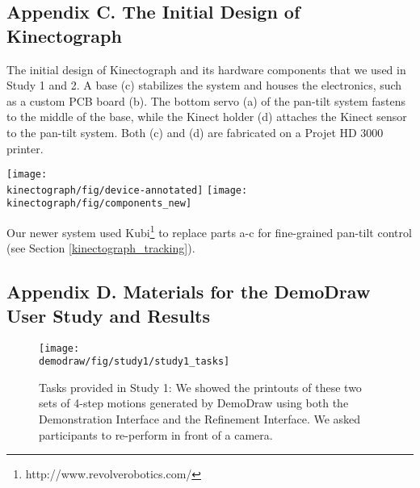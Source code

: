 \begin{appendices}
\clearpage


\subsection{Appendix C. The Initial Design of Kinectograph}
\label{kinectograph_original_design}

The initial design of Kinectograph and its hardware components that we used in Study 1 and 2. A base (c) stabilizes the system and houses the electronics, such as a custom PCB board (b). The bottom servo (a) of the pan-tilt system fastens to the middle of the base, while the Kinect holder (d) attaches the Kinect sensor to the pan-tilt system. Both (c) and (d) are fabricated on a Projet HD 3000 printer.

\centering
\vspace{20pt}
\texttt{[image: \\kinectograph/fig/device-annotated]}
\vspace{20pt}
\texttt{[image: \\kinectograph/fig/components\_new]}

Our newer system used Kubi\footnote{http://www.revolverobotics.com/} to replace parts a-c for fine-grained pan-tilt control (see Section \ref{kinectograph_tracking}).

\clearpage


\subsection{Appendix D. Materials for the DemoDraw User Study and Results}
\label{demodraw_study_materials}

\renewcommand\thefigure{D.\arabic{figure}}

\begin{figure}[h!]
     \centering
    \texttt{[image: \\demodraw/fig/study1/study1\_tasks]}
    \caption{Tasks provided in Study 1: We showed the printouts of these two sets of 4-step motions generated by DemoDraw using both the Demonstration Interface and the Refinement Interface. We asked participants to re-perform in front of a camera.}
    \label{fig:study_review_tasks}
 \end{figure}


\end{appendices}
